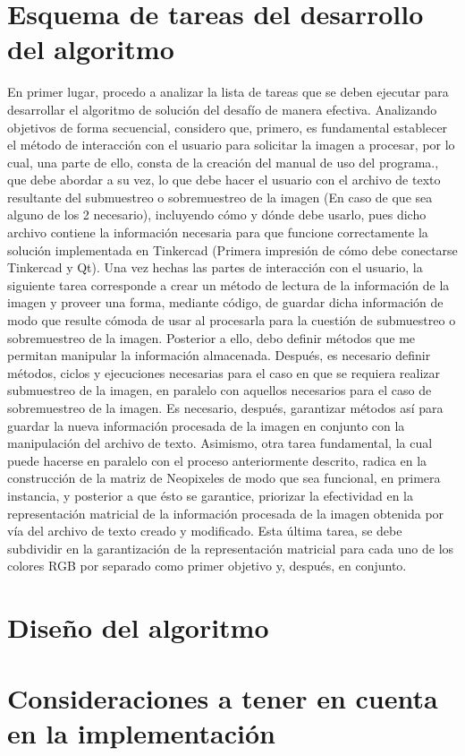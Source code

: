 \documentclass{article}
\begin{document}
 \section{Esquema de tareas del desarrollo del algoritmo}
 En primer lugar, procedo a analizar la lista de tareas que se deben ejecutar para desarrollar el algoritmo de solución del desafío de manera efectiva. Analizando objetivos de forma secuencial, considero que, primero, es fundamental establecer el método de interacción con el usuario para solicitar la imagen a procesar, por lo cual, una parte de ello, consta de la creación del manual de uso del programa., que debe abordar a su vez, lo que debe hacer el usuario con el archivo de texto resultante del submuestreo o sobremuestreo de la imagen (En caso de que sea alguno de los 2 necesario), incluyendo cómo y dónde debe usarlo, pues dicho archivo contiene la información necesaria para que funcione correctamente la solución implementada en Tinkercad (Primera impresión de cómo debe conectarse Tinkercad y Qt). Una vez hechas las partes de interacción con el usuario, la siguiente tarea corresponde a crear un método de lectura de la información de la imagen y proveer una forma, mediante código, de guardar dicha información de modo que resulte cómoda de usar al procesarla para la cuestión de submuestreo o sobremuestreo de la imagen. Posterior a ello, debo definir métodos que me permitan manipular la información almacenada. Después, es necesario definir métodos, ciclos y ejecuciones necesarias para el caso en que se requiera realizar submuestreo de la imagen, en paralelo con aquellos necesarios para el caso de sobremuestreo de la imagen. Es necesario, después, garantizar métodos así para guardar la nueva información procesada de la imagen en conjunto con la manipulación del archivo de texto. Asimismo, otra tarea fundamental, la cual puede hacerse en paralelo con el proceso anteriormente descrito, radica en la construcción de la matriz de Neopixeles de modo que sea funcional, en primera instancia, y posterior a que ésto se garantice, priorizar la efectividad en la representación matricial de la información procesada de la imagen obtenida por vía del archivo de texto creado y modificado. Esta última tarea, se debe subdividir en la garantización de la representación matricial para cada uno de los colores RGB por separado como primer objetivo y, después, en conjunto.
 \section{Diseño del algoritmo}
 \section{Consideraciones a tener en cuenta en la implementación}


\end{document}
